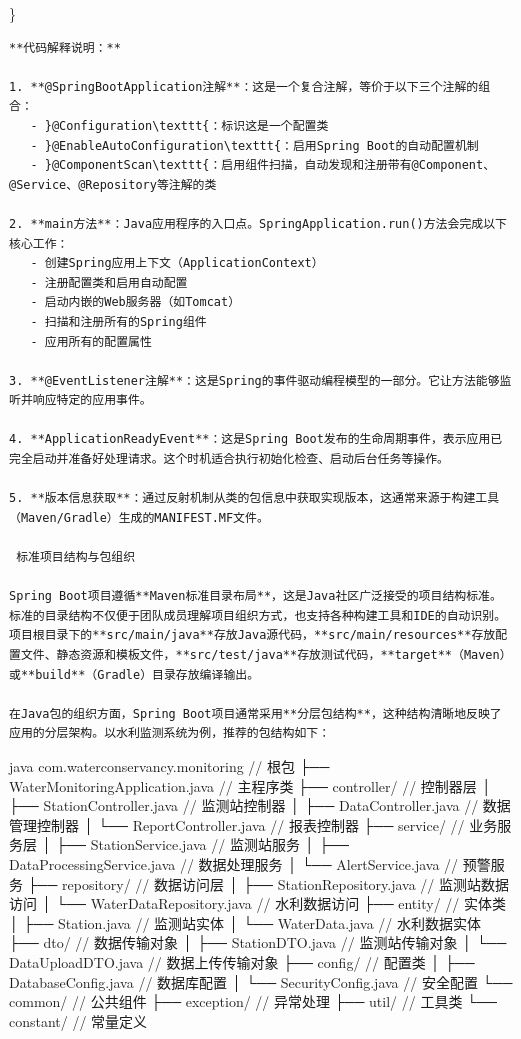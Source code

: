 \}

\begin{lstlisting}
**代码解释说明：**

1. **@SpringBootApplication注解**：这是一个复合注解，等价于以下三个注解的组合：
   - }@Configuration\texttt{：标识这是一个配置类
   - }@EnableAutoConfiguration\texttt{：启用Spring Boot的自动配置机制
   - }@ComponentScan\texttt{：启用组件扫描，自动发现和注册带有@Component、@Service、@Repository等注解的类

2. **main方法**：Java应用程序的入口点。SpringApplication.run()方法会完成以下核心工作：
   - 创建Spring应用上下文（ApplicationContext）
   - 注册配置类和启用自动配置
   - 启动内嵌的Web服务器（如Tomcat）
   - 扫描和注册所有的Spring组件
   - 应用所有的配置属性

3. **@EventListener注解**：这是Spring的事件驱动编程模型的一部分。它让方法能够监听并响应特定的应用事件。

4. **ApplicationReadyEvent**：这是Spring Boot发布的生命周期事件，表示应用已完全启动并准备好处理请求。这个时机适合执行初始化检查、启动后台任务等操作。

5. **版本信息获取**：通过反射机制从类的包信息中获取实现版本，这通常来源于构建工具（Maven/Gradle）生成的MANIFEST.MF文件。

 标准项目结构与包组织

Spring Boot项目遵循**Maven标准目录布局**，这是Java社区广泛接受的项目结构标准。标准的目录结构不仅便于团队成员理解项目组织方式，也支持各种构建工具和IDE的自动识别。项目根目录下的**src/main/java**存放Java源代码，**src/main/resources**存放配置文件、静态资源和模板文件，**src/test/java**存放测试代码，**target**（Maven）或**build**（Gradle）目录存放编译输出。

在Java包的组织方面，Spring Boot项目通常采用**分层包结构**，这种结构清晰地反映了应用的分层架构。以水利监测系统为例，推荐的包结构如下：
\end{lstlisting}

java com.waterconservancy.monitoring // 根包 ├── WaterMonitoringApplication.java // 主程序类 ├── controller/ // 控制器层 │ ├── StationController.java // 监测站控制器 │ ├── DataController.java // 数据管理控制器 │ └── ReportController.java // 报表控制器 ├── service/ // 业务服务层 │ ├── StationService.java // 监测站服务 │ ├── DataProcessingService.java // 数据处理服务 │ └── AlertService.java // 预警服务 ├── repository/ // 数据访问层 │ ├── StationRepository.java // 监测站数据访问 │ └── WaterDataRepository.java // 水利数据访问 ├── entity/ // 实体类 │ ├── Station.java // 监测站实体 │ └── WaterData.java // 水利数据实体 ├── dto/ // 数据传输对象 │ ├── StationDTO.java // 监测站传输对象 │ └── DataUploadDTO.java // 数据上传传输对象 ├── config/ // 配置类 │ ├── DatabaseConfig.java // 数据库配置 │ └── SecurityConfig.java // 安全配置 └── common/ // 公共组件 ├── exception/ // 异常处理 ├── util/ // 工具类 └── constant/ // 常量定义

